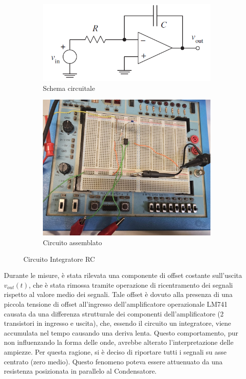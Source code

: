 \documentclass[a4paper,12pt]{article}
\begin{document}
\begin{figure}[H]
  \centering
  \begin{subfigure}{0.45\textwidth}
    \includegraphics[width=\linewidth]{Schematic_Integratore.png}
    \caption{Schema circuitale}
  \end{subfigure}
  \hspace{0.05\textwidth}
  \begin{subfigure}{0.45\textwidth}
    \includegraphics[width=\linewidth]{Integratore_montato.jpg}
    \caption{Circuito assemblato}
  \end{subfigure}
  \caption{Circuito Integratore RC}
  \label{fig: integratore}
\end{figure}

Durante le misure, è stata rilevata una componente di offset costante sull’uscita \(v_{out}(t)\), che è stata rimossa tramite operazione di ricentramento dei segnali rispetto al valore medio dei segnali. Tale offset è dovuto alla presenza di una piccola tensione di offset all’ingresso dell’amplificatore operazionale LM741 causata da una differenza strutturale dei componenti dell'amplificatore (2 transistori in ingresso e uscita), che, essendo il circuito un integratore, viene accumulata nel tempo causando una deriva lenta. Questo comportamento, pur non influenzando la forma delle onde, avrebbe alterato l'interpretazione delle ampiezze. Per questa ragione, si è deciso di riportare tutti i segnali su asse centrato (zero medio). Questo fenomeno poteva essere attuenuato da una resistenza posizionata in parallelo al Condensatore.
\end{document}
